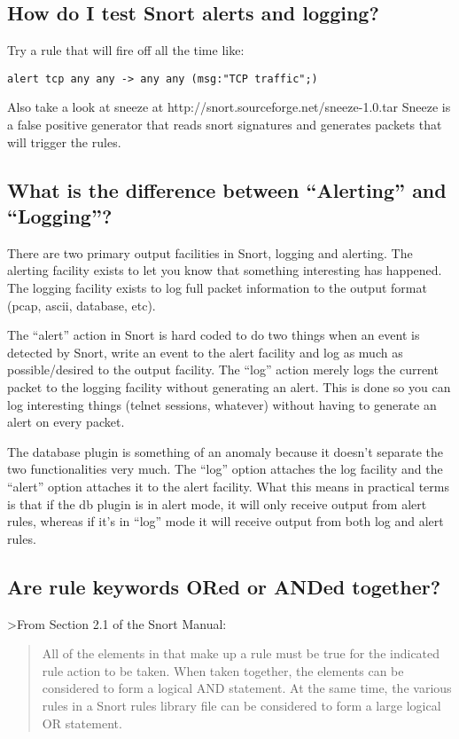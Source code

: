 \documentclass{article}
\newcommand{\myquote}[1]{\begin{quote}#1\end{quote}}
\begin{document}
\subsection{How do I test Snort alerts and logging?}

Try a rule that will fire off all the time like:

\begin{verbatim}alert tcp any any -> any any (msg:"TCP traffic";)\end{verbatim}
 
Also take a look at sneeze at http://snort.sourceforge.net/sneeze-1.0.tar
Sneeze is a false positive generator that reads snort signatures and generates
packets that will trigger the rules.

\subsection{What is the difference between ``Alerting'' and ``Logging''?}

There are two primary output facilities in Snort, logging and alerting. The
alerting facility exists to let you know that something interesting has
happened. The logging facility exists to log full packet information to the
output format (pcap, ascii, database, etc).

The ``alert'' action in Snort is hard coded to do two things when an event is
detected by Snort, write an event to the alert facility and log as much as
possible/desired to the output facility. The ``log'' action merely logs the
current packet to the logging facility without generating an alert. This is
done so you can log interesting things (telnet sessions, whatever) without
having to generate an alert on every packet.

The database plugin is something of an anomaly because it doesn't separate the
two functionalities very much. The ``log'' option attaches the log facility and
the ``alert'' option attaches it to the alert facility. What this means in
practical terms is that if the db plugin is in alert mode, it will only receive
output from alert rules, whereas if it's in ``log'' mode it will receive output
from both log and alert rules.

\subsection{Are rule keywords ORed or ANDed together?}

>From Section 2.1 of the Snort Manual:
\myquote{
    All of the elements in that make up a rule must be true for the indicated
    rule action to be taken. When taken together, the elements can be
    considered to form a logical AND statement. At the same time, the various
    rules in a Snort rules library file can be considered to form a large
    logical OR statement.
 }
\end{document}
